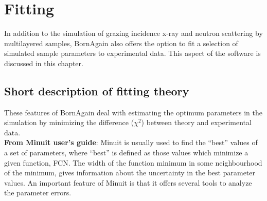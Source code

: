 \newpage
\chapter{Fitting}


In addition to the simulation of grazing incidence
x-ray and neutron scattering by
multilayered samples, BornAgain also offers the option to
fit a selection of simulated sample parameters to experimental data.  This aspect
of the software is discussed in this chapter.

\section{Short description of fitting theory}

These features of BornAgain deal with estimating the optimum parameters
in the simulation by minimizing the difference ($\chi^2$) between theory and experimental data.\\

\textbf{From Minuit user's guide}: Minuit is usually used to find the ``best'' values of a set of
parameters, where ``best'' is defined as those values which minimize a
given function, FCN. The width of the function minimum in some
neighbourhood of the minimum, gives information about the uncertainty
in the best parameter values. An important feature of Minuit is that
it offers several tools to analyze the parameter errors.




